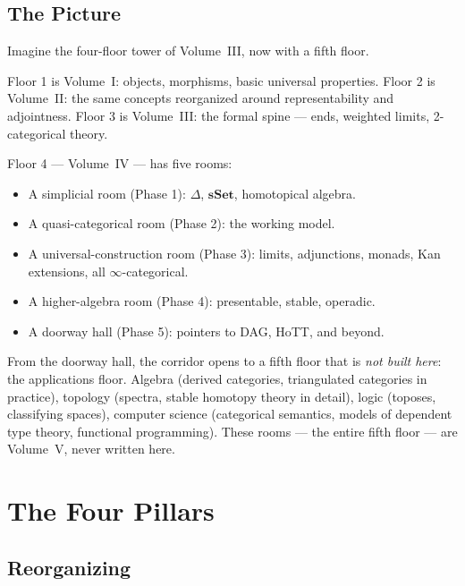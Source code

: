\subsection{The Picture}

\begin{remark}
Imagine the four-floor tower of Volume~III, now with a fifth floor.

Floor 1 is Volume~I: objects, morphisms, basic universal properties.
Floor 2 is Volume~II: the same concepts reorganized around representability
and adjointness. Floor 3 is Volume~III: the formal spine — ends,
weighted limits, 2-categorical theory.

Floor 4 — Volume~IV — has five rooms:
\begin{itemize}
  \item A simplicial room (Phase 1): $\Delta$, $\mathbf{sSet}$,
        homotopical algebra.
  \item A quasi-categorical room (Phase 2): the working model.
  \item A universal-construction room (Phase 3): limits, adjunctions,
        monads, Kan extensions, all $\infty$-categorical.
  \item A higher-algebra room (Phase 4): presentable, stable, operadic.
  \item A doorway hall (Phase 5): pointers to DAG, HoTT, and beyond.
\end{itemize}

From the doorway hall, the corridor opens to a fifth floor that is
\emph{not built here}: the applications floor. Algebra (derived
categories, triangulated categories in practice), topology (spectra,
stable homotopy theory in detail), logic (toposes, classifying spaces),
computer science (categorical semantics, models of dependent type theory,
functional programming). These rooms — the entire fifth floor — are
Volume~V, never written here.
\end{remark}


\section{The Four Pillars}
\label{sec:four-pillars}

\subsection{Reorganizing}

